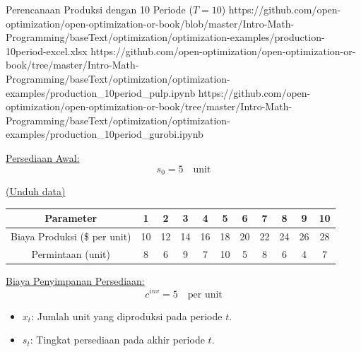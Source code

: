 \begin{examplewithallcode}{Perencanaan Produksi dengan 10 Periode (\(T = 10\))}
{https://github.com/open-optimization/open-optimization-or-book/blob/master/Intro-Math-Programming/baseText/optimization/optimization-examples/production-10period-excel.xlsx}
{https://github.com/open-optimization/open-optimization-or-book/tree/master/Intro-Math-Programming/baseText/optimization/optimization-examples/production_10period_pulp.ipynb}
{https://github.com/open-optimization/open-optimization-or-book/tree/master/Intro-Math-Programming/baseText/optimization/optimization-examples/production_10period_gurobi.ipynb}
\label{ex:production-10period}

\underline{Persediaan Awal:}
\[
s_0 = 5 \quad \text{unit}
\]

\href{https://github.com/open-optimization/open-optimization-or-book/blob/master/Intro-Math-Programming/baseText/optimization/optimization-examples/production-planning-data.xlsx}{(Unduh data)}
\begin{center}
\begin{tabular}{@{}c*{10}{c}@{}}
\toprule
\textbf{Parameter}               & 1  & 2  & 3  & 4  & 5  & 6  & 7  & 8  & 9  & 10 \\ \midrule
Biaya Produksi (\$ per unit)     & 10 & 12 & 14 & 16 & 18 & 20 & 22 & 24 & 26 & 28 \\
Permintaan (unit)                & 8  & 6  & 9  & 7  & 10 & 5  & 8  & 6  & 4  & 7  \\
\bottomrule
\end{tabular}
\par{}\label{tab:modeling-sums-tab01}%

\end{center}

\underline{Biaya Penyimpanan Persediaan:}
\[
c^{inv} = 5 \quad \text{per unit}
\]

\begin{itemize}
    \item \(x_t\): Jumlah unit yang diproduksi pada periode \(t\).
    \item \(s_t\): Tingkat persediaan pada akhir periode \(t\).
\end{itemize}


\end{examplewithallcode}
